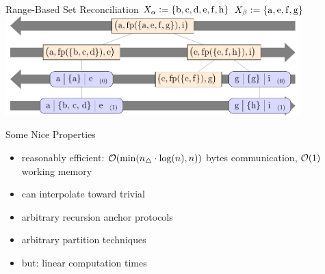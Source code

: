 \documentclass{beamer}
\begin{document}
\begin{frame}{Range-Based Set Reconciliation}
    $X_{\alpha} \vcentcolon= \{\mathrm{b}, \mathrm{c}, \mathrm{d}, \mathrm{e}, \mathrm{f}, \mathrm{h} \}$
    \hfill
    $X_{\beta} \vcentcolon= \{\mathrm{a}, \mathrm{e}, \mathrm{f}, \mathrm{g}\}$
    \includegraphics[keepaspectratio=true,width=11.4cm]{examplerun.pdf}

\end{frame}

\begin{frame}{Some Nice Properties}
    \begin{itemize}
        \item reasonably efficient: $\mathcal{O}(\min(n_{\triangle} \cdot \log(n), n))$ bytes communication, $\mathcal{O}(1)$ working memory
        \item can interpolate toward trivial
        \item arbitrary recursion anchor protocols
        \item arbitrary partition techniques \pause
        \item but: linear computation times
    \end{itemize}
\end{frame}
\end{document}
